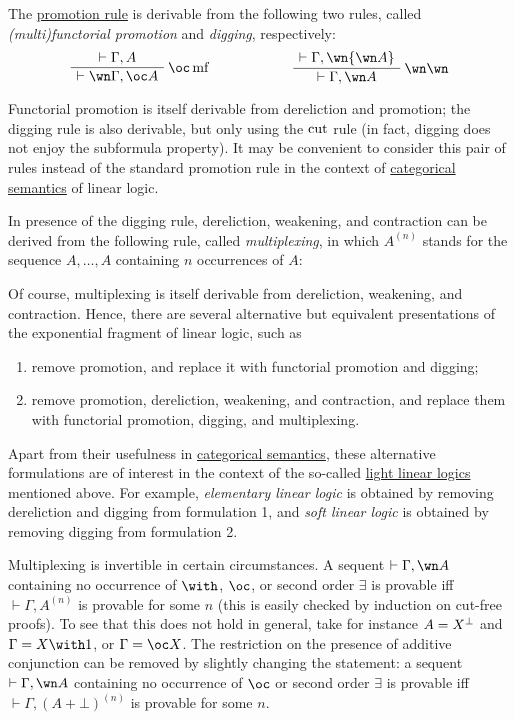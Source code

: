 The \hyperref[sequents-and-proofs]{promotion rule} is
derivable from the following two rules, called \emph{(multi)functorial
promotion} and \emph{digging}, respectively:
\begin{equation*}
\AxRule{\vdash\Gamma,A}
\LabelRule{\oc\rulename{mf}}
\UnaRule{\vdash\wn\Gamma,\oc A}
\DisplayProof
\qquad\qquad\qquad
\AxRule{\vdash\Gamma,\wn{\wn A}}
\LabelRule{\wn\wn}
\UnaRule{\vdash\Gamma,\wn A}
\DisplayProof
\end{equation*}

Functorial promotion is itself derivable from dereliction and promotion;
the digging rule is also derivable, but only using the
\(\rulename{cut}\) rule (in fact, digging does not enjoy the subformula
property). It may be convenient to consider this pair of rules instead
of the standard promotion rule in the context of
\hyperref[categorical-semantics]{categorical semantics} of linear logic.

In presence of the digging rule, dereliction, weakening, and contraction
can be derived from the following rule, called \emph{multiplexing}, in
which \(A^{(n)}\) stands for the sequence \(A,\ldots,A\) containing
\(n\) occurrences of \(A\):
\begin{prooftree}
\end{prooftree}

Of course, multiplexing is itself derivable from dereliction, weakening,
and contraction. Hence, there are several alternative but equivalent
presentations of the exponential fragment of linear logic, such as
\begin{enumerate}
\item remove promotion, and replace it with functorial promotion and
  digging;
\item remove promotion, dereliction, weakening, and contraction, and replace
  them with functorial promotion, digging, and multiplexing.
\end{enumerate}

Apart from their usefulness in \hyperref[categorical-semantics]{categorical
semantics}, these alternative formulations are of interest in the
context of the so-called \hyperref[light-linear-logics]{light linear logics}
mentioned above. For example, \emph{elementary linear logic} is obtained
by removing dereliction and digging from formulation 1, and \emph{soft
linear logic} is obtained by removing digging from formulation 2.

Multiplexing is invertible in certain circumstances. A sequent
\(\vdash\Gamma,\wn A\) containing no occurrence of \(\with\), \(\oc\),
or second order \(\exists\) is provable iff \(\vdash\Gamma,A^{(n)}\) is
provable for some \(n\) (this is easily checked by induction on cut-free
proofs). To see that this does not hold in general, take for instance
\(A=X\orth\) and \(\Gamma=X\with\one\), or \(\Gamma=\oc X\). The
restriction on the presence of additive conjunction can be removed by
slightly changing the statement: a sequent \(\vdash\Gamma,\wn A\)
containing no occurrence of \(\oc\) or second order \(\exists\) is
provable iff \(\vdash\Gamma,(A\plus\bot)^{(n)}\) is provable for some
\(n\).

